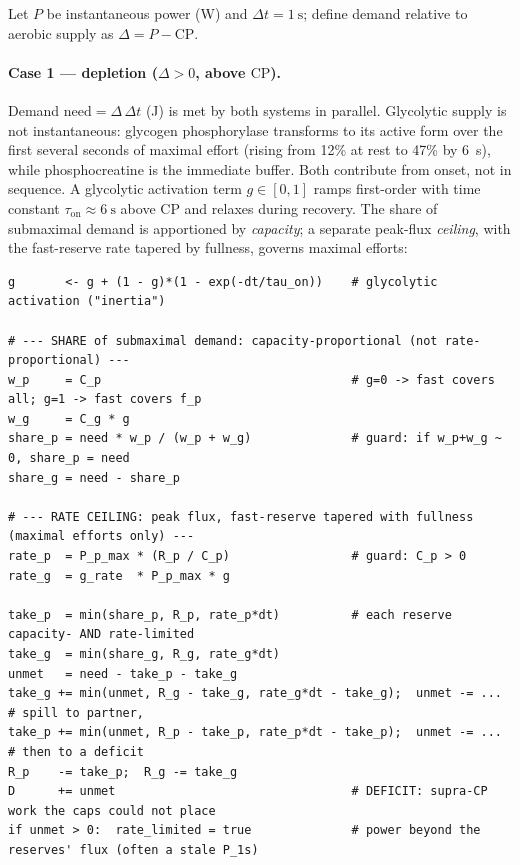 \documentclass[11pt,a4paper]{article}
\newcommand{\CP}{\ensuremath{\mathrm{CP}}}
\newcommand{\tauon}{\ensuremath{\tau_{\mathrm{on}}}}
\begin{document}
Let $P$ be instantaneous power (W) and $\Delta t = 1~\mathrm{s}$; define demand relative to aerobic supply
as $\Delta = P - \CP$.

\paragraph{Case 1 --- depletion ($\Delta > 0$, above \CP).} Demand $\mathrm{need} = \Delta\,\Delta t$ (J)
is met by both systems in parallel. Glycolytic supply is not instantaneous: glycogen phosphorylase
transforms to its active form over the first several seconds of maximal effort (rising from 12\% at rest to
47\% by 6~s\citep{Parolin1999}), while phosphocreatine is the immediate buffer.\citep{Bogdanis1996,Bogdanis1998}
Both contribute from onset, not in sequence.\citep{GonzalezAlonso2000} A glycolytic activation term
$g \in [0,1]$ ramps first-order with time constant $\tauon \approx 6~\mathrm{s}$ above \CP{} and relaxes
during recovery. The share of submaximal demand is apportioned by \emph{capacity}; a separate peak-flux
\emph{ceiling}, with the fast-reserve rate tapered by fullness, governs maximal efforts:

\begin{lstlisting}[style=pseudo]
g       <- g + (1 - g)*(1 - exp(-dt/tau_on))    # glycolytic activation ("inertia")

# --- SHARE of submaximal demand: capacity-proportional (not rate-proportional) ---
w_p     = C_p                                   # g=0 -> fast covers all; g=1 -> fast covers f_p
w_g     = C_g * g
share_p = need * w_p / (w_p + w_g)              # guard: if w_p+w_g ~ 0, share_p = need
share_g = need - share_p

# --- RATE CEILING: peak flux, fast-reserve tapered with fullness (maximal efforts only) ---
rate_p  = P_p_max * (R_p / C_p)                 # guard: C_p > 0
rate_g  = g_rate  * P_p_max * g

take_p  = min(share_p, R_p, rate_p*dt)          # each reserve capacity- AND rate-limited
take_g  = min(share_g, R_g, rate_g*dt)
unmet   = need - take_p - take_g
take_g += min(unmet, R_g - take_g, rate_g*dt - take_g);  unmet -= ...   # spill to partner,
take_p += min(unmet, R_p - take_p, rate_p*dt - take_p);  unmet -= ...   # then to a deficit
R_p    -= take_p;  R_g -= take_g
D      += unmet                                 # DEFICIT: supra-CP work the caps could not place
if unmet > 0:  rate_limited = true              # power beyond the reserves' flux (often a stale P_1s)
\end{lstlisting}
\end{document}
